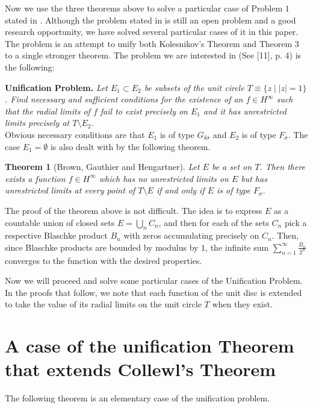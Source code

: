 \documentclass[12pt]{article}
\newtheorem{theorem}{Theorem}
\begin{document}
\noindent Now we use the three theorems above to solve a particular case of Problem $1$ stated in \cite{Da}. Although the problem stated in \cite{Da} is still an open problem and a good research opportunity, we have solved several particular cases of it in this paper. The problem is an attempt to unify both {Kolesnikov's Theorem} and {Theorem 3} to a single stronger theorem. The problem we are interested in (See [11], p. 4) is the following:\vspace{0.12in}

\noindent\textbf{Unification Problem.}
\emph{Let $E_1\subset E_2$ be subsets of the unit circle $T\equiv\lbrace z\mid |z|=1 \rbrace$. Find necessary and sufficient conditions for the existence of an $f\in H^\infty$ such that the radial limits of $f$ fail to exist precisely on $E_1$ and it has unrestricted limits precisely at $T\setminus E_2$.}\\

\noindent Obvious necessary conditions are that $E_1$ is of type $G_{\delta\sigma}$ and $E_2$ is of type $F_\sigma$. The case $E_1=\emptyset$ is also dealt with by the following theorem.

\begin{theorem}[Brown, Gauthier and Hengartner]
Let $E$ be a set on $T$. Then there exists a function $f\in H^\infty$ which has no unrestricted limits on $E$ but has unrestricted limits at every point of $T\setminus E$ if and only if $E$ is of type $F_\sigma$.
\end{theorem}

\noindent The proof of the theorem above is not difficult. The idea is to express $E$ as a countable union of closed sets $E=\bigcup_n C_n$, and then for each of the sets $C_n$ pick a respective Blaschke product $B_n$ with zeros accumulating precisely on $C_n$. Then, since Blaschke products are bounded by modulus by $1$, the infinite sum $\sum_{n=1}^\infty \frac{B_n}{2^n}$ converges to the function with the desired properties.\vspace{0.12in}

\noindent Now we will proceed and solve some particular cases of the Unification Problem. In the proofs that follow, we note that each function of the unit disc is extended to take the value of its radial limits on the unit circle $T$ when they exist.
\section{A case of the unification Theorem that extends Collewl's Theorem}
The following theorem is an elementary case of the unification problem.\\
\end{document}
